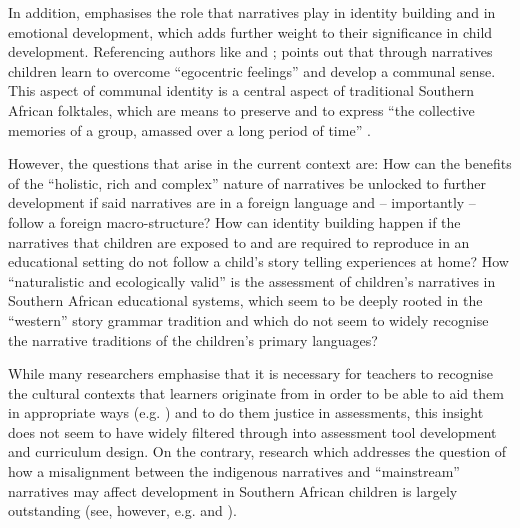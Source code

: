 \documentclass[output=paper,modfonts]{langscibook}
\begin{document}
In addition, \citet[13]{Bloch2006} emphasises the role that narratives play in identity building and in emotional development, which adds further weight to their significance in child development. Referencing authors like \citet[44]{Meek1992} and \citet[10]{Egan2005}; \citeauthor{Bloch2006} points out that through narratives children learn to overcome “egocentric feelings” and develop a communal sense. This aspect of communal identity is a central aspect of traditional Southern African folktales, which are means to preserve and to express “the collective memories of a group, amassed over a long period of time” \citep[65]{Ntuli2011}. 

However, the questions that arise in the current context are: How can the benefits of the “holistic, rich and complex” nature of narratives be unlocked to further  development if said narratives are in a foreign language and – importantly – follow a foreign macro-structure? How can identity building happen if the narratives that children are exposed to and are required to reproduce in an educational setting do not follow a child’s story telling experiences at home? How “naturalistic and ecologically valid” is the assessment of children’s narratives in Southern African educational systems, which seem to be deeply rooted in the “western” story grammar tradition and which do not seem to widely recognise the narrative traditions of the children’s primary languages?

While many researchers emphasise that it is necessary for teachers to recognise the cultural contexts that learners originate from in order to be able to aid them in appropriate ways (e.g. \citealt{Heath1983,Michaels1991,Bloch2006,Souto-Manning2013}) and to do them justice in assessments, this insight does not seem to have widely filtered through into assessment tool development and curriculum design. On the contrary, research which addresses the question of how a misalignment between the indigenous narratives and “mainstream” narratives may affect  development in Southern African children is largely outstanding (see, however, e.g. \citealt{Obiechina1992} and \citealt{Bloch2006}).
\end{document}
